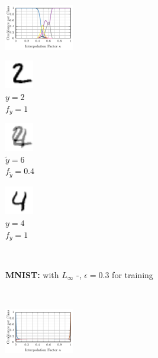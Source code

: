 \begin{figure}[t]
\begin{subfigure}{0.225\textwidth}
        \includegraphics[height=2cm]{fig_mnist_advtrain_4_interpolation}
    \end{subfigure}
    \begin{subfigure}{0.085\textwidth}
        \centering
        \includegraphics[height=1.25cm]{fig_mnist_advtrain_4_interpolation_0}\\
        \tiny $y{=}2$\\
        $f_y{=}1$
    \end{subfigure}
    \begin{subfigure}{0.085\textwidth}
        \centering
        \includegraphics[height=1.25cm]{fig_mnist_advtrain_4_interpolation_05}\\
        \tiny $\tilde{y}{=}6$\\
        $f_{\tilde{y}}{=}0.4$
    \end{subfigure}
    \begin{subfigure}{0.085\textwidth}
        \centering
        \includegraphics[height=1.25cm]{fig_mnist_advtrain_4_interpolation_1}\\
        \tiny $y{=}4$\\
        $f_y{=}1$
    \end{subfigure}
    \\[4px]
    \begin{subfigure}{1\textwidth}
        \centering
        \textbf{MNIST:} \textbf{\ConfTrain} with $L_\infty$ \PGD-\FConf, $\epsilon = 0.3$ for training
    \end{subfigure}
    \\[4px]
    \begin{subfigure}{0.225\textwidth}
        \includegraphics[height=2cm]{fig_mnist_ours10_0_interpolation}

\end{subfigure}
\end{figure}
